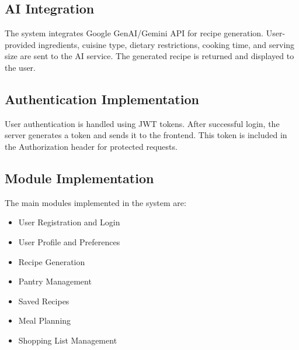\subsection{AI Integration}

The system integrates Google GenAI/Gemini API for recipe generation. User-provided ingredients, cuisine type, dietary restrictions, cooking time, and serving size are sent to the AI service. The generated recipe is returned and displayed to the user.

\subsection{Authentication Implementation}

User authentication is handled using JWT tokens. After successful login, the server generates a token and sends it to the frontend. This token is included in the Authorization header for protected requests.

\subsection{Module Implementation}

The main modules implemented in the system are:

\begin{itemize}
    \item User Registration and Login
    \item User Profile and Preferences
    \item Recipe Generation
    \item Pantry Management
    \item Saved Recipes
    \item Meal Planning
    \item Shopping List Management
\end{itemize}
